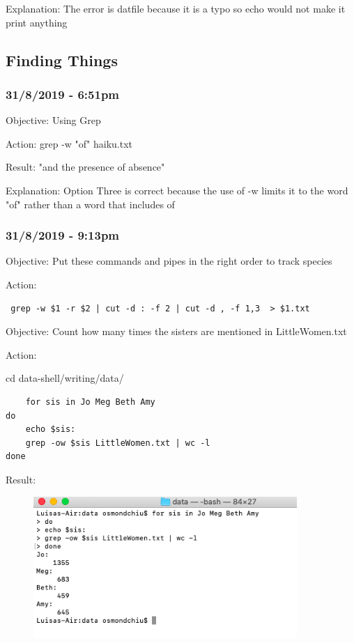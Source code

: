 \documentclass{article}
\begin{document}
Explanation: The error is datfile because it is a typo so echo would not make it print anything

\subsection{Finding Things}
\subsubsection*{31/8/2019 - 6:51pm}

Objective: Using Grep

Action: grep -w "of" haiku.txt

Result: "and the presence of absence"

Explanation: Option Three is correct because the use of -w limits it to the word "of" rather than a word that includes of

\subsubsection*{31/8/2019 - 9:13pm}

Objective: Put these commands and pipes in the right order to track species 

Action: 

\begin{verbatim} grep -w $1 -r $2 | cut -d : -f 2 | cut -d , -f 1,3  > $1.txt \end{verbatim}

Objective: Count how many times the sisters are mentioned in LittleWomen.txt 

Action: 

cd data-shell/writing/data/

\begin{verbatim}
    for sis in Jo Meg Beth Amy
do
	echo $sis:
	grep -ow $sis LittleWomen.txt | wc -l
done
\end{verbatim}

Result:

\begin{figure}[htp]
    \centering
    \includegraphics[width=10cm]{Screenshot24.png}
    \label{fig:ls-24}
\end{figure}
\end{document}
